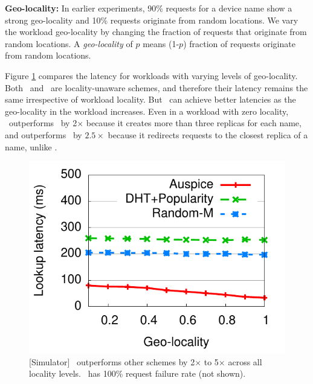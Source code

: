 




\textbf{Geo-locality:}  In earlier experiments, 90\% requests for a device name show a strong geo-locality and 10\% requests originate from random  locations. 
We vary the workload geo-locality by changing the fraction of requests that originate from random  locations.  A \emph{geo-locality} of $p$ means (1-$p$) fraction of requests originate from random  locations.

Figure \ref{fig:varylocality} compares the latency for workloads with varying levels of geo-locality.
Both \staticthree\ and \codons\ are locality-unaware schemes, and therefore their latency remains the same irrespective of workload locality. But \auspice\ can achieve better latencies  as the geo-locality in the workload increases. Even in a workload with zero locality,   \auspice\ outperforms \staticthree\ by 2$\times$ because it creates more than three replicas for each name,  and outperforms \codons\ by $2.5\times$  because it redirects requests to the closest replica of a name, unlike \codons.

\begin{figure}
\centering
\includegraphics[scale=0.5]{graph/medianlatencyVSlocality.pdf}
\vspace{-0.1in}
\caption{[Simulator] \auspice\ outperforms other schemes by 2$\times$ to 5$\times$  across all locality levels. \replicateall\ has  100\% request failure rate  (not shown).}
\label{fig:varylocality}
\vspace{-0.1in}
\end{figure}


